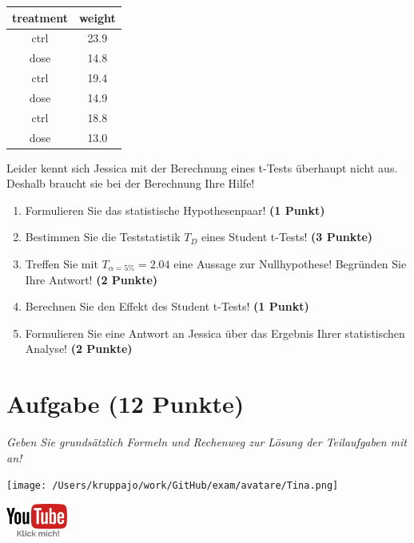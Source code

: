 \documentclass[a4paper, 9pt]{scrartcl}\usepackage[]{graphicx}\usepackage[]{xcolor}
\begin{document}
\begin{table}[!h]
\centering
\begin{tabular}{cc}
\toprule
treatment & weight\\
\midrule
ctrl & 23.9\\
dose & 14.8\\
ctrl & 19.4\\
dose & 14.9\\
ctrl & 18.8\\
\addlinespace
dose & 13.0\\
\bottomrule
\end{tabular}
\end{table}



Leider kennt sich Jessica mit der Berechnung eines t-Tests überhaupt nicht aus. Deshalb braucht sie bei der Berechnung Ihre Hilfe!

\begin{enumerate}
  \item Formulieren Sie das statistische Hypothesenpaar! \textbf{(1 Punkt)}
  \item Bestimmen Sie die Teststatistik $T_{D}$ eines Student t-Tests! \textbf{(3 Punkte)}
  \item Treffen Sie mit $T_{\alpha = 5\%} = 2.04$ eine Aussage zur Nullhypothese! Begründen Sie Ihre Antwort! \textbf{(2 Punkte)}
  \item Berechnen Sie den Effekt des Student t-Tests! \textbf{(1 Punkt)}
  \item Formulieren Sie eine Antwort an Jessica über das Ergebnis Ihrer statistischen Analyse! \textbf{(2 Punkte)}
\end{enumerate} 
\clearpage

\section{Aufgabe \hfill (12 Punkte)}

\textit{Geben Sie grundsätzlich Formeln und Rechenweg zur Lösung der Teilaufgaben mit an!} \\[1Ex]
 

 
\begin{minipage}[t]{0.5\textwidth}
\texttt{[image: /Users/kruppajo/work/GitHub/exam/avatare/Tina.png]}
\end{minipage}
\begin{minipage}[t]{0.5\textwidth}
\hfill
\href{https://youtu.be/Cq_rF_z4xOk}{\includegraphics[width = 2cm]{img/youtube}}
\end{minipage}
\vspace{-3ex}
\end{document}
